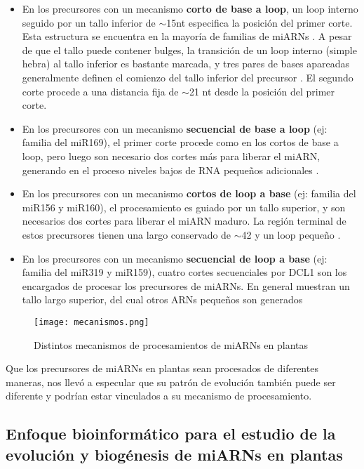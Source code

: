 \begin{itemize}
    \item En los precursores con un mecanismo \textbf{corto de base a loop}, un loop interno seguido por un tallo inferior de $\sim$15nt especifica la posición del primer corte.
        Esta estructura se encuentra en la mayoría de familias de miARNs \citep{Mateos2010,pmid20015653,pmid20015654}.
        A pesar de que el tallo puede contener bulges, la transición de un loop interno (simple hebra) al tallo inferior es bastante marcada, y tres pares de bases apareadas generalmente definen el comienzo del tallo inferior del precursor \citep{Bologna2013}.
        El segundo corte procede a una distancia fija de $\sim$21 nt desde la posición del primer corte.
    \item En los precursores con un mecanismo \textbf{secuencial de base a loop} (ej: familia del miR169), el primer corte procede como en los cortos de base a loop, pero luego son necesario dos cortes más para liberar el miARN, generando en el proceso niveles bajos de RNA pequeños adicionales \citep{Bologna2013}.
    \item En los precursores con un mecanismo \textbf{cortos de loop a base} (ej: familia del miR156 y miR160), el procesamiento es guiado por un tallo superior, y son necesarios dos cortes para liberar el miARN maduro.
        La región terminal de estos precursores tienen una largo conservado de $\sim$42 y un loop pequeño \citep{Bologna2013}.
    \item En los precursores con un mecanismo \textbf{secuencial de loop a base} (ej: familia del miR319 y miR159), cuatro cortes secuenciales por DCL1 son los encargados de procesar los precursores de miARNs.
        En general muestran un tallo largo superior, del cual otros ARNs pequeños son generados \citep{pmid19850910,Bologna2009,Bologna2013}
\end{itemize}

\begin{figure}[htbp!] 
    \centering    
    \texttt{[image: mecanismos.png]}
    \caption[Mecanismos de procesamiento]{Distintos mecanismos de procesamientos de miARNs en plantas}
    \label{fig:mecanismos}
\end{figure}


Que los precursores de miARNs en plantas sean procesados de diferentes maneras, nos llevó a especular que su patrón de evolución también puede ser diferente y podrían estar vinculados a su mecanismo de procesamiento.


\subsection[Estudio de la evolución y biogénesis de miARNs en plantas]{Enfoque bioinformático para el estudio de la evolución y biogénesis de miARNs en plantas}



